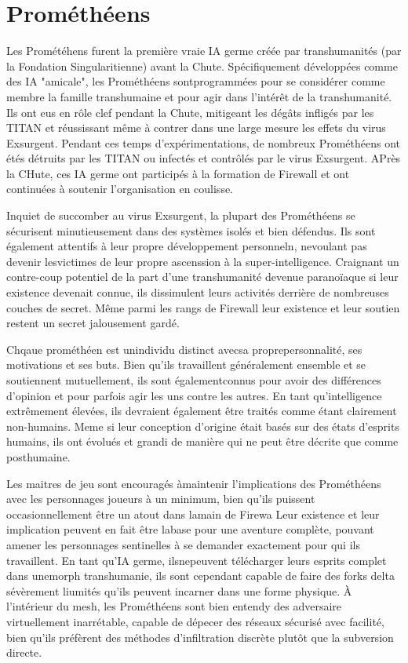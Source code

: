 {\section{Prométhéens } 

Les Prométéhens furent la première vraie IA germe créée par transhumanités (par la Fondation Singularitienne) avant la Chute. Spécifiquement développées comme des IA "amicale", les Prométhéens sontprogrammées pour se considérer comme membre la famille transhumaine et pour agir dans l'intérêt de la transhumanité. Ils ont eus en rôle clef pendant la Chute, mitigeant les dégâts infligés par les TITAN et réussissant même à contrer dans une large mesure les effets du virus Exsurgent. Pendant ces temps d'expérimentations, de nombreux Prométhéens ont étés détruits par les TITAN ou infectés et contrôlés par le virus Exsurgent. APrès la CHute, ces IA germe ont participés à la formation de Firewall et ont continuées à soutenir l'organisation en coulisse. 

Inquiet de succomber au virus Exsurgent, la plupart des Prométhéens se sécurisent minutieusement dans des systèmes isolés et bien défendus. Ils sont également attentifs à leur propre développement personneln, nevoulant pas devenir lesvictimes de leur propre ascenssion à la super-intelligence. Craignant un contre-coup potentiel de la part d'une transhumanité devenue paranoïaque si leur existence devenait connue, ils dissimulent leurs activités derrière de nombreuses couches de secret. Même parmi les rangs de Firewall leur existence et leur soutien restent un secret jalousement gardé. 

Chqaue prométhéen est unindividu distinct avecsa proprepersonnalité, ses motivations et ses buts. Bien qu'ils travaillent généralement ensemble et se soutiennent mutuellement, ils sont égalementconnus pour avoir des différences d'opinion et pour parfois agir les uns contre les autres. En tant qu'intelligence extrêmement élevées, ils devraient également être traités comme étant clairement non-humains. Meme si leur conception d'origine était basés sur des états d'esprits humains, ils ont évolués et grandi de manière qui ne peut être décrite que comme posthumaine. 

Les maitres de jeu sont encouragés àmaintenir l'implications des Prométhéens avec les personnages joueurs à un minimum, bien qu'ils puissent occasionnellement être un atout dans lamain de Firewa Leur existence et leur implication peuvent en fait être labase pour une aventure complète, pouvant amener les personnages sentinelles à se demander exactement pour qui ils travaillent. En tant qu'IA germe, ilsnepeuvent télécharger leurs esprits complet dans unemorph transhumanie, ils sont cependant capable de faire des forks delta sévèrement liumités qu'ils peuvent incarner dans une forme physique. À l'intérieur du mesh, les Prométhéens sont bien entendy des adversaire virtuellement inarrétable, capable de dépecer des réseaux sécurisé avec facilité, bien qu'ils préfèrent des méthodes d'infiltration discrète plutôt que la subversion directe. 

}
